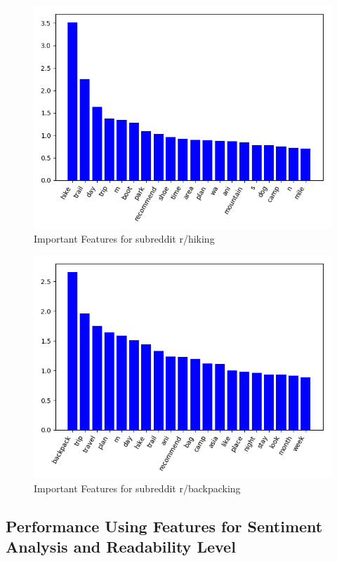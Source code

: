 \documentclass{sig-alternate-05-2015}
\begin{document}
\begin{figure}[H]
\centering
\includegraphics[width=\linewidth]{plots/coefficients-hiking-dim-393.png}
\caption{Important Features for subreddit r/hiking}
\label{fig:featureImportanceHiking}
\end{figure}

\begin{figure}[H]
\centering
\includegraphics[width=\linewidth]{plots/coefficients-backpacking-dim-78.png}
\caption{Important Features for subreddit r/backpacking}
\label{fig:featureImportanceBackpacking}
\end{figure}

\subsection{Performance Using Features for Sentiment Analysis and Readability Level}
\end{document}
